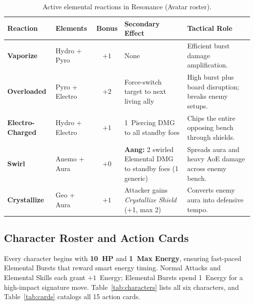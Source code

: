 \documentclass[11pt,a4paper]{article}
\begin{document}
\begin{table}[H]
\centering
\caption{Active elemental reactions in Resonance (Avatar roster).}
\label{tab:reactions}
\small
\begin{tabularx}{\textwidth}{@{}L{2.4cm} L{2.25cm} c L{4.55cm} Y@{}}
\toprule
Reaction & Elements & Bonus & Secondary Effect & Tactical Role \\
\midrule
\textbf{Vaporize} & Hydro + Pyro & $+1$ & None & Efficient burst damage amplification. \\
\textbf{Overloaded} & Pyro + Electro & $+2$ & Force-switch target to next living ally & High burst plus board disruption; breaks enemy setups. \\
\textbf{Electro-Charged} & Hydro + Electro & $+1$ & 1~Piercing DMG to all standby foes & Chips the entire opposing bench through shields. \\
\textbf{Swirl} & Anemo + Aura & $+0$ & \textbf{Aang:} 2 swirled Elemental DMG to standby foes (1 generic) & Spreads aura and heavy AoE damage across enemy bench. \\
\textbf{Crystallize} & Geo + Aura & $+1$ & Attacker gains \emph{Crystallize Shield} (+1, max 2) & Converts enemy aura into defensive tempo. \\
\bottomrule
\end{tabularx}
\end{table}

\subsection{Character Roster and Action Cards}

Every character begins with \textbf{10~HP} and \textbf{1~Max Energy}, ensuring fast-paced Elemental Bursts that reward smart energy timing. Normal Attacks and Elemental Skills each grant $+1$~Energy; Elemental Bursts spend 1~Energy for a high-impact signature move. Table~\ref{tab:characters} lists all six characters, and Table~\ref{tab:cards} catalogs all 15 action cards.
\end{document}
